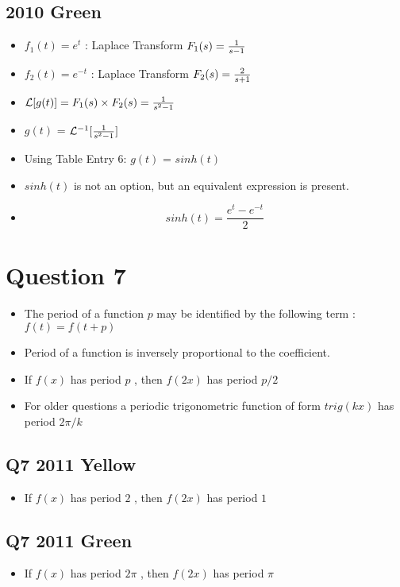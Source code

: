 \documentclass[11pt,a4paper,titlepage,oneside,openany]{article}
\numberwithin{equation}{section}
\numberwithin{algorithm}{section}
\numberwithin{figure}{section}
\numberwithin{table}{section}
\begin{document}
\subsection*{2010 Green}

\begin{itemize}
\item $f_1(t)=e^t$ : Laplace Transform $F_1(s)={1 \over s-1}$
\item $f_2(t)=e^{-t}$ : Laplace Transform $F_2(s)={2 \over s+1}$
\item $\mathcal{L}[g(t)] = F_1(s)\times F_2(s) = {1 \over s^2-1}$
\item $g(t)$ = $\mathcal{L}^{-1}[{1 \over s^2-1}]$
\item Using Table Entry 6: $g(t)$ = $sinh(t)$
\item $sinh(t)$ is not an option, but an equivalent expression is present.
\item \[ sinh(t) = \frac{e^t - e^{-t}}{2} \]
\end{itemize}
\newpage
\section*{Question 7}

\begin{itemize}
\item The period of a function $p$ may be identified by the following term : $f(t) = f(t+p)$
\item Period of a function is inversely proportional to the coefficient.
\item If $f(x)$ has period $p$ , then $f(2x)$ has period $p/2$
\item For older questions a periodic trigonometric function of form $trig(kx)$ has period $2\pi/k$
\end{itemize}
\subsection*{Q7 2011 Yellow}
\begin{itemize}
\item If $f(x)$ has period $2$ , then $f(2x)$ has period $1$
\end{itemize}
\subsection*{Q7 2011 Green}
\begin{itemize}
\item If $f(x)$ has period $2\pi$ , then $f(2x)$ has period $\pi$
\end{itemize}
\end{document}
